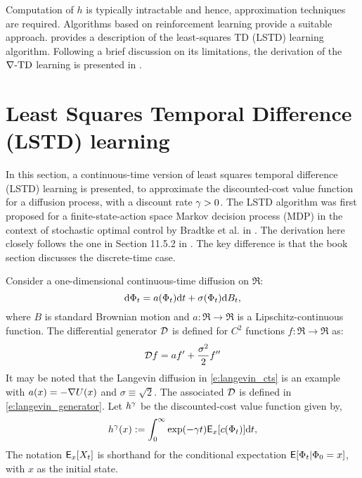 Computation of $h$ is typically intractable and hence, approximation techniques are required. Algorithms based on reinforcement learning provide a suitable approach.  provides a description of the least-squares TD (LSTD) learning algorithm. Following a brief discussion on its limitations,  the derivation of the $\nabla\text{-TD}$ learning is presented in . 

\section{Least Squares Temporal Difference (LSTD) learning} 
\label{s:lstd}
In this section, a continuous-time version of least squares temporal difference (LSTD) learning is presented, to approximate the discounted-cost value function for a diffusion process, with a discount rate $\gamma  >0$. The LSTD algorithm was first proposed for a finite-state-action space Markov decision process (MDP) in the context of stochastic optimal control  by Bradtke et al. in \cite{brabar96}. The derivation here closely follows the one in Section 11.5.2 in \cite{ctcn}. The key difference is that the book section discusses the discrete-time case. 

Consider a one-dimensional continuous-time diffusion on $\Re$:
\begin{equation}
\ud \markovstate_t = a(\markovstate_t) \ud t + \sigma(\markovstate_t) \ud B_t,
\label{e:cts_diffusion}
\end{equation}
where $B$ is standard Brownian motion and $a : \Re \to \Re$ is a Lipschitz-continuous function. The differential generator ${\cal D}$ is defined for $C^2$ functions $f:\Re \to \Re$ as: 
\begin{equation}
\generate f = a f' + \frac{\sigma^2}{2} f''
\label{e:diffusion_generator}
\end{equation}
It may be noted that the Langevin diffusion in \eqref{e:langevin_cts} is an example with $a(x) = -\nabla U(x)$ and $\sigma \equiv \sqrt{2}$. The associated ${\cal D}$ is defined in \eqref{e:langevin_generator}. 
Let $h^\gamma$ be the discounted-cost value function given by,
\begin{equation}
h^\discount(x) := \int_0^\infty \exp(-\discount t )\Expect_x[c(\markovstate_t)] \ud t, 
\label{e:discount_value_fn}
\end{equation}
The notation ${\sf E}_x[X_t]$ is shorthand for the conditional expectation ${\sf E}[\Phi_t|\Phi_0 = x]$, with $x$ as the initial state. 

